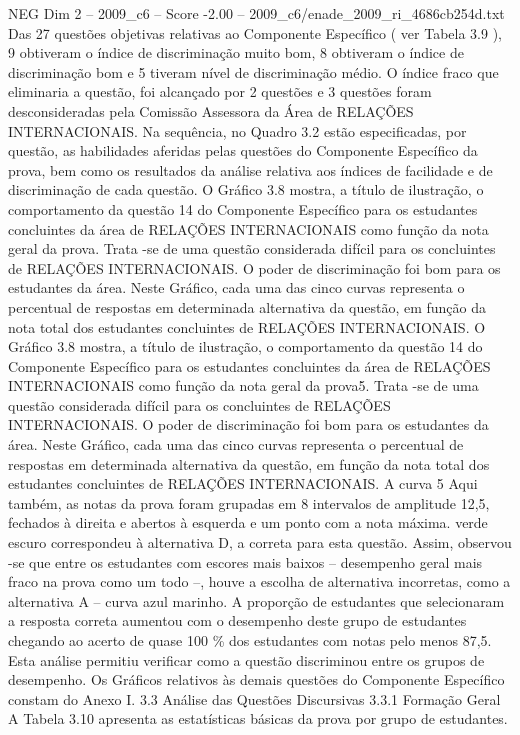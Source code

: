 \begin{textsample}{NEG Dim 2 – 2009\_c6 – Score -2.00 – 2009\_c6/enade\_2009\_ri\_4686cb254d.txt}
Das 27 questões objetivas relativas ao Componente Específico ( ver Tabela 3.9 ), 9 obtiveram o índice de discriminação muito bom, 8 obtiveram o índice de discriminação bom e 5 tiveram nível de discriminação médio.
O índice fraco que eliminaria a questão, foi alcançado por 2 questões e 3 questões foram desconsideradas pela Comissão Assessora da Área de RELAÇÕES INTERNACIONAIS.
Na sequência, no Quadro 3.2 estão especificadas, por questão, as habilidades aferidas pelas questões do Componente Específico da prova, bem como os resultados da análise relativa aos índices de facilidade e de discriminação de cada questão.
O Gráfico 3.8 mostra, a título de ilustração, o comportamento da questão 14 do Componente Específico para os estudantes concluintes da área de RELAÇÕES INTERNACIONAIS como função da nota geral da prova.
Trata -se de uma questão considerada difícil para os concluintes de RELAÇÕES INTERNACIONAIS.
O poder de discriminação foi bom para os estudantes da área.
Neste Gráfico, cada uma das cinco curvas representa o percentual de respostas em determinada alternativa da questão, em função da nota total dos estudantes concluintes de RELAÇÕES INTERNACIONAIS.
O Gráfico 3.8 mostra, a título de ilustração, o comportamento da questão 14 do Componente Específico para os estudantes concluintes da área de RELAÇÕES INTERNACIONAIS como função da nota geral da prova5.
Trata -se de uma questão considerada difícil para os concluintes de RELAÇÕES INTERNACIONAIS.
O poder de discriminação foi bom para os estudantes da área.
Neste Gráfico, cada uma das cinco curvas representa o percentual de respostas em determinada alternativa da questão, em função da nota total dos estudantes concluintes de RELAÇÕES INTERNACIONAIS.
A curva 5 Aqui também, as notas da prova foram grupadas em 8 intervalos de amplitude 12,5, fechados à direita e abertos à esquerda e um ponto com a nota máxima. verde escuro correspondeu à alternativa D, a correta para esta questão.
Assim, observou -se que entre os estudantes com escores mais baixos – desempenho geral mais fraco na prova como um todo –, houve a escolha de alternativa incorretas, como a alternativa A – curva azul marinho.
A proporção de estudantes que selecionaram a resposta correta aumentou com o desempenho deste grupo de estudantes chegando ao acerto de quase 100 \% dos estudantes com notas pelo menos 87,5.
Esta análise permitiu verificar como a questão discriminou entre os grupos de desempenho.
Os Gráficos relativos às demais questões do Componente Específico constam do Anexo I. 3.3 Análise das Questões Discursivas 3.3.1 Formação Geral A Tabela 3.10 apresenta as estatísticas básicas da prova por grupo de estudantes.

\end{textsample}
